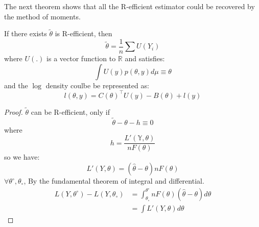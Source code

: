 The next theorem shows that all the R-efficient estimator could be recovered by the method of moments.

\begin{theorem}
	If there exists $\tilde{\theta}$ is R-efficient, then 
	\begin{equation}
		\tilde{\theta} = \frac{1}{n}\sum U(Y_i)
	\end{equation}
	where $U(.)$ is a vector function to $\mathbb{R}$ and satisfies:
	\begin{equation*}
		\int U(y) p(\theta, y) d\mu \equiv \theta
	\end{equation*}
	and the $\log$ density coulbe be represented as:
	\begin{equation*}
		l(\theta, y) = C(\theta)^\top U(y) - B(\theta) + l(y)
	\end{equation*}
\end{theorem}

\begin{proof}
	$\tilde{\theta}$ can be R-efficient, only if 
	\begin{equation*}
		\tilde{\theta} - \theta - h \equiv 0
	\end{equation*}
	where
	\begin{equation*}
		h = \frac{L'(\mathbb{Y}, \theta)}{nF(\theta)}
	\end{equation*} 
	so we have:
	\begin{equation*}
		L'(Y,\theta) = (\hat{\theta} - \theta) n F(\theta)
	\end{equation*}
	$\forall \theta^\circ, \theta_\circ$, By the fundamental theorem of integral and differential.
	\begin{align*}
		L(Y,\theta^\circ) - L(Y, \theta_\circ) &= \int_{\theta_\circ}^{\theta^\circ}n F(\theta)(\hat{\theta} - \theta)d\theta \\
		&= \int L'(Y,\theta)d\theta
	\end{align*}
\end{proof}


